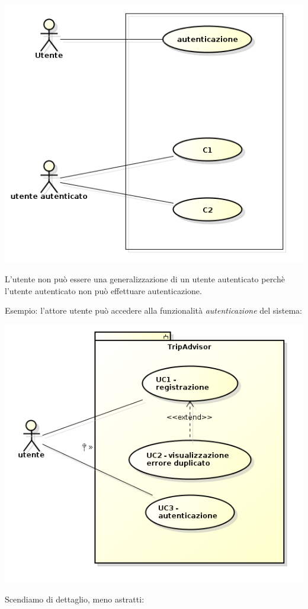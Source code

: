 \begin{center}

\includegraphics[width=0.75\columnwidth]{img3} %

\end{center}

L'utente non può essere una generalizzazione di un utente autenticato perchè l'utente autenticato non può effettuare autenticazione.

Esempio: l'attore utente può accedere alla funzionalità \textit{autenticazione} del sistema:

\begin{center}

\includegraphics[width=0.75\columnwidth]{img4} %

\end{center}

Scendiamo di dettaglio, meno astratti:

